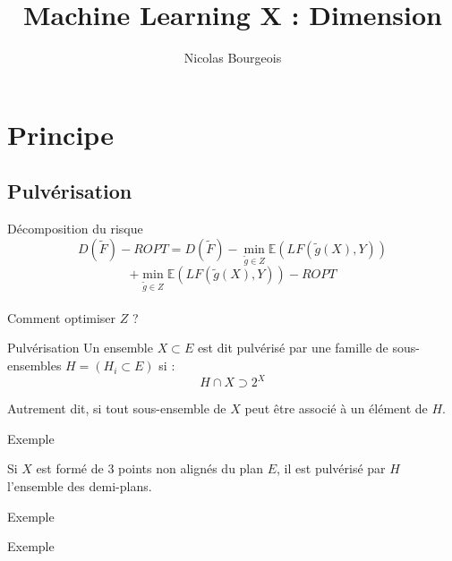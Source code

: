\documentclass[11pt]{beamer}
\title{Machine Learning X : Dimension}
\author{Nicolas Bourgeois}
\date{}
\begin{document}
\section{Principe}
\subsection{Pulvérisation}
\begin{frame}{Décomposition du risque}
$$D(\tilde{F}) - ROPT = D(\tilde{F}) - \min_{\tilde{g}\in Z}\mathbb{E}(LF(\tilde{g}(X),Y))$$
$$+\min_{\tilde{g}\in Z}\mathbb{E}(LF(\tilde{g}(X),Y)) - ROPT $$
\\ \vspace{0.3cm}
Comment optimiser $Z$ ?
\end{frame}

\begin{frame}{Pulvérisation}
Un ensemble $X \subset E$ est dit pulvérisé par une famille de sous-ensembles $H=(H_i \subset E)$ si :\\

$$H \cap X \supset 2^X$$

Autrement dit, si tout sous-ensemble de $X$ peut être associé à un élément de $H$. 

\end{frame}

\begin{frame}{Exemple}

Si $X$ est formé de 3 points non alignés du plan $E$, il est pulvérisé par $H$ l'ensemble des demi-plans.


\end{frame}

\begin{frame}{Exemple}
\begin{figure}
\end{figure}
\end{frame}
\begin{frame}{Exemple}
\begin{figure}
\end{figure}
\end{frame}
\end{document}
